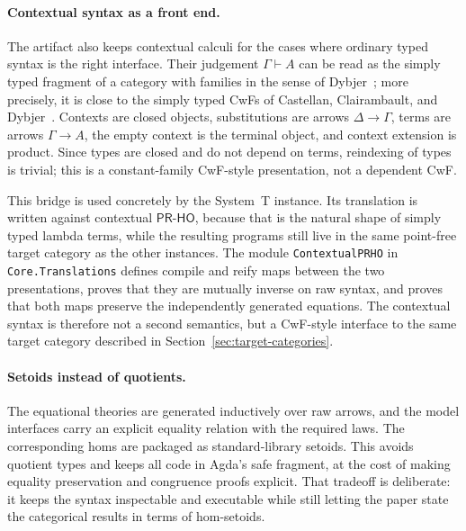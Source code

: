 \documentclass[sigplan,10pt,anonymous,review,screen]{acmart}
\newcommand{\PRHO}{\ensuremath{\mathsf{PR\mbox{-}HO}}}
\newcommand{\AgdaFile}[1]{\texttt{#1}}
\begin{document}
\paragraph{Contextual syntax as a front end.}
The artifact also keeps contextual calculi for the cases where ordinary
typed syntax is the right interface.  Their judgement
\(\Gamma \vdash A\) can be read as the simply typed fragment of a
category with families in the sense of
Dybjer~\cite{Dybjer1996InternalTypeTheory}; more precisely, it is close
to the simply typed CwFs of
Castellan, Clairambault, and Dybjer~\cite{CastellanClairambaultDybjer2021CwF}.
Contexts are closed objects, substitutions are arrows
\(\Delta \to \Gamma\), terms are arrows \(\Gamma \to A\), the empty
context is the terminal object, and context extension is product.
Since types are closed and do not depend on terms, reindexing of types is
trivial; this is a constant-family CwF-style presentation, not a
dependent CwF.

This bridge is used concretely by the System~T instance.  Its
translation is written against contextual \PRHO{}, because that is the
natural shape of simply typed lambda terms, while the resulting programs
still live in the same point-free target category as the other
instances.  The module \AgdaFile{ContextualPRHO} in
\AgdaFile{Core.Translations} defines compile and reify maps between the
two presentations, proves that they are mutually inverse on raw syntax,
and proves that both maps preserve the independently generated
equations.  The contextual syntax is therefore not a second semantics,
but a CwF-style interface to the same target category described in
Section~\ref{sec:target-categories}.

\paragraph{Setoids instead of quotients.}
The equational theories are generated inductively over raw arrows, and
the model interfaces carry an explicit equality relation with the
required laws.  The corresponding homs are packaged as standard-library
setoids.  This avoids quotient types and keeps all code in Agda's safe
fragment, at the cost of making equality preservation and congruence
proofs explicit.  That tradeoff is deliberate: it keeps the syntax
inspectable and executable while still letting the paper state the
categorical results in terms of hom-setoids.
\end{document}

